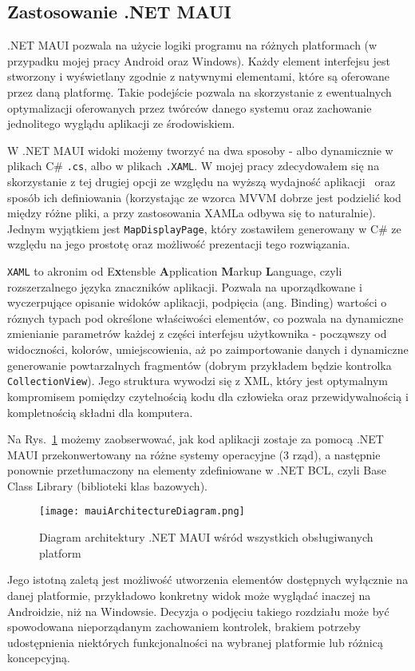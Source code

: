 \subsection{Zastosowanie .NET MAUI}

.NET MAUI pozwala na użycie logiki programu na różnych platformach 
(w przypadku mojej pracy Android oraz Windows).
Każdy element interfejsu jest stworzony i wyświetlany zgodnie z natywnymi elementami, 
które są oferowane przez daną platformę. Takie podejście pozwala na skorzystanie 
z ewentualnych optymalizacji oferowanych przez twórców danego systemu oraz 
zachowanie jednolitego wyglądu aplikacji ze środowiskiem.

W .NET MAUI widoki możemy tworzyć na dwa sposoby - albo dynamicznie w plikach C\# \verb|.cs|, 
albo w plikach \verb|.XAML|. W mojej pracy zdecydowałem się na skorzystanie z tej drugiej opcji 
ze względu na wyższą wydajność aplikacji~\cite{xamlPerformance} oraz sposób ich definiowania 
(korzystając ze wzorca MVVM dobrze jest podzielić kod między różne pliki, 
a przy zastosowania XAMLa odbywa się to naturalnie). Jednym wyjątkiem jest \verb|MapDisplayPage|, 
który zostawiłem generowany w C\# ze względu na jego prostotę oraz możliwość prezentacji tego rozwiązania.

\verb|XAML| to akronim od E\textbf{x}tensble \textbf{A}pplication \textbf{M}arkup \textbf{L}anguage, 
czyli rozszerzalnego języka znaczników aplikacji. Pozwala na uporządkowane i wyczerpujące opisanie 
widoków aplikacji, podpięcia (ang. Binding) wartości o róznych typach pod określone właściwości 
elementów, co pozwala na dynamiczne zmienianie parametrów każdej z części interfejsu użytkownika - 
począwszy od widoczności, kolorów, umiejscowienia, aż po zaimportowanie danych i dynamiczne generowanie 
powtarzalnych fragmentów (dobrym przykładem będzie kontrolka \verb|CollectionView|).
Jego struktura wywodzi się z XML, który jest optymalnym kompromisem pomiędzy czytelnością kodu dla człowieka 
oraz przewidywalnością i kompletnością składni dla komputera.

Na Rys.~\ref{img:mauiArchitectureDiagram} możemy zaobserwować, jak kod aplikacji 
zostaje za pomocą .NET MAUI przekonwertowany na różne systemy operacyjne (3 rząd), 
a następnie ponownie przetłumaczony na elementy zdefiniowane w .NET BCL, 
czyli Base Class Library (biblioteki klas bazowych).
\clearpage
\begin{figure}[ht]
    \centering
    \texttt{[image: mauiArchitectureDiagram.png]}
    \caption{Diagram architektury .NET MAUI wśród wszystkich obsługiwanych platform~\cite{mauiDefinition}}
    \label{img:mauiArchitectureDiagram}
\end{figure}


Jego istotną zaletą jest możliwość utworzenia elementów dostępnych wyłącznie 
na danej platformie, przykładowo konkretny widok może wyglądać inaczej na Androidzie, 
niż na Windowsie. Decyzja o podjęciu takiego rozdziału może być 
spowodowana nieporządanym zachowaniem kontrolek, brakiem potrzeby udostępnienia 
niektórych funkcjonalności na wybranej platformie lub różnicą koncepcyjną.